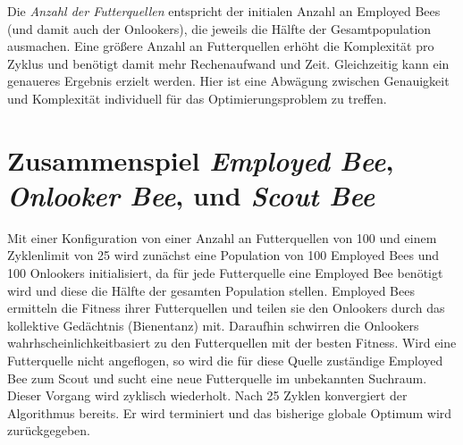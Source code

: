 Die \emph{Anzahl der Futterquellen} entspricht der initialen Anzahl an
Employed Bees (und damit auch der Onlookers), die jeweils die Hälfte der
Gesamtpopulation ausmachen. Eine größere Anzahl an Futterquellen erhöht die
Komplexität pro Zyklus und benötigt damit mehr Rechenaufwand und Zeit.
Gleichzeitig kann ein genaueres Ergebnis erzielt werden. Hier ist eine
Abwägung zwischen Genauigkeit und Komplexität individuell für das
Optimierungsproblem zu treffen.

\section{Zusammenspiel \emph{Employed Bee}, \emph{Onlooker Bee}, und
    \emph{Scout Bee}}

Mit einer Konfiguration von einer Anzahl an Futterquellen von 100 und einem
Zyklenlimit von 25 wird zunächst eine Population von 100 Employed Bees und
100 Onlookers initialisiert, da für jede Futterquelle eine Employed Bee
benötigt wird und diese die Hälfte der gesamten Population stellen.
Employed Bees ermitteln die Fitness ihrer Futterquellen und teilen sie den
Onlookers durch das kollektive Gedächtnis (Bienentanz) mit. Daraufhin
schwirren die Onlookers wahrhscheinlichkeitbasiert zu den Futterquellen mit
der besten Fitness. Wird eine Futterquelle nicht angeflogen, so wird die
für diese Quelle zuständige Employed Bee zum Scout und sucht eine neue
Futterquelle im unbekannten Suchraum.
Dieser Vorgang wird zyklisch wiederholt. Nach 25 Zyklen konvergiert der
Algorithmus bereits. Er wird terminiert und das bisherige globale Optimum
wird zurückgegeben.